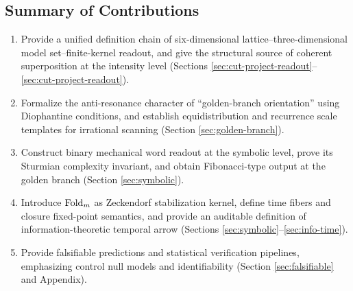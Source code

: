 \subsection{Summary of Contributions}

\begin{enumerate}
  \item Provide a unified definition chain of six-dimensional lattice--three-dimensional model set--finite-kernel readout, and give the structural source of coherent superposition at the intensity level (Sections \ref{sec:cut-project-readout}--\ref{sec:cut-project-readout}).
  \item Formalize the anti-resonance character of ``golden-branch orientation'' using Diophantine conditions, and establish equidistribution and recurrence scale templates for irrational scanning (Section \ref{sec:golden-branch}).
  \item Construct binary mechanical word readout at the symbolic level, prove its Sturmian complexity invariant, and obtain Fibonacci-type output at the golden branch (Section \ref{sec:symbolic}).
  \item Introduce $\mathrm{Fold}_m$ as Zeckendorf stabilization kernel, define time fibers and closure fixed-point semantics, and provide an auditable definition of information-theoretic temporal arrow (Sections \ref{sec:symbolic}--\ref{sec:info-time}).
  \item Provide falsifiable predictions and statistical verification pipelines, emphasizing control null models and identifiability (Section \ref{sec:falsifiable} and Appendix).
\end{enumerate}
